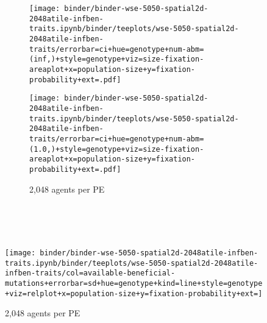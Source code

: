 \begin{figure}[h]
\begin{minipage}{0.7\textwidth}
    \begin{subfigure}[b]{\linewidth}
      \begin{minipage}{0.88\textwidth}
        \begin{minipage}{0.53\textwidth}
          \texttt{[image: binder/binder-wse-5050-spatial2d-2048atile-infben-traits.ipynb/binder/teeplots/wse-5050-spatial2d-2048atile-infben-traits/errorbar=ci+hue=genotype+num-abm=(inf,)+style=genotype+viz=size-fixation-areaplot+x=population-size+y=fixation-probability+ext=.pdf]}%
        \end{minipage}%
        \begin{minipage}{0.47\textwidth}
          \texttt{[image: binder/binder-wse-5050-spatial2d-2048atile-infben-traits.ipynb/binder/teeplots/wse-5050-spatial2d-2048atile-infben-traits/errorbar=ci+hue=genotype+num-abm=(1.0,)+style=genotype+viz=size-fixation-areaplot+x=population-size+y=fixation-probability+ext=.pdf]}
        \end{minipage}
      \end{minipage}%
      \hspace{-3ex}%
      \begin{minipage}{0.1\textwidth}
        \caption{\footnotesize 2,048 agents per PE\\~\\~\\}
        \label{fig:wse-inf-one:2048}
      \end{minipage}%
    \end{subfigure}%

~\vspace{-1.2ex}

\texttt{[image: binder/binder-wse-5050-spatial2d-2048atile-infben-traits.ipynb/binder/teeplots/wse-5050-spatial2d-2048atile-infben-traits/col=available-beneficial-mutations+errorbar=sd+hue=genotype+kind=line+style=genotype+viz=relplot+x=population-size+y=fixation-probability+ext=]}


\end{minipage}
\end{figure}
